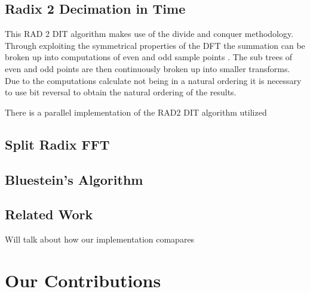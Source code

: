 \documentclass[journal]{IEEEtran}
\begin{document}
	\subsection{Radix 2 Decimation in Time}
		\par{
			This RAD 2 DIT algorithm makes use of the divide and conquer methodology. Through exploiting 
			the symmetrical properties of the DFT the summation can be broken up into computations of even 
			and odd sample points \cite{Soni}. The sub trees of even and odd points are then continuously 
			broken up into smaller transforms. Due to the computations calculate not being in a natural ordering 
			it is necessary to use bit reversal to obtain the natural ordering of the results.
		}
		\par{
			There is a parallel implementation of the RAD2 DIT algorithm utilized 
		}
	\subsection{Split Radix FFT}
		\par{

		}
	\subsection{Bluestein's Algorithm}
		\par{

		}

\subsection{Related Work}
\par{
	Will talk about how our implementation comapares
}

\section{Our Contributions}

\medskip


\end{document}
